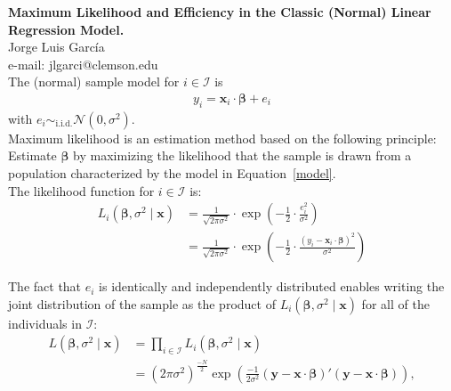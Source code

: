 
\let\counterwithout\relax
\let\counterwithin\relax
{}



\noindent \textbf{Maximum Likelihood and Efficiency in the Classic (Normal) Linear Regression Model.}\\
\noindent Jorge Luis García \\
\noindent e-mail: jlgarci@clemson.edu\\

\noindent The (normal) sample model for $i \in \mathcal{I}$ is
\begin{align}
	y_i = \bm{x}_i \cdot \bm{\beta} + e_i \label{model}
\end{align}
\noindent with $e_i \sim_{\text{i.i.d.}} \mathcal{N} \left( 0, \sigma^2 \right)$. \\ 

\noindent Maximum likelihood is an estimation method based on the following principle: Estimate $\bm{\beta}$ by maximizing the likelihood that the sample   is drawn from a population characterized by the model in Equation~\eqref{model}.\\

\noindent The likelihood function for $i \in \mathcal{I}$ is:
\begin{align}
	L_i \left( \bm{\beta}, \sigma^2 \mid \bm{x} \right) & = \frac{1}{\sqrt{2 \pi \sigma^2}} \cdot \exp{ \left( - \frac{1}{2} \cdot \frac{ e_i^2 }{ \sigma^2 } \right) } \nonumber \\ 
	& = \frac{1}{\sqrt{2 \pi \sigma^2}} \cdot \exp{ \left( - \frac{1}{2} \cdot \frac{ \left( y_i - \bm{x}_i \cdot \bm{\beta} \right)^2 }{ \sigma^2 } \right) } 
\end{align}

\noindent The fact that $e_i$ is identically and independently distributed enables writing the joint distribution of the sample as the product of $L_i \left( \bm{\beta}, \sigma^2 \mid \bm{x} \right)$ for all of the individuals in $\mathcal{I}$: 
\begin{align}
	L \left( \bm{\beta}, \sigma^2 \mid \bm{x} \right) & = \prod \limits _{i \in \mathcal{I}} L_i \left( \bm{\beta}, \sigma^2 \mid \bm{x} \right) \nonumber \\ 
	  & = {\left( 2 \pi \sigma^2 \right)}^{\frac{-N}{2}} \exp{ \left( \frac{-1}{2 \sigma^2} \left( \bm{y} - \bm{x} \cdot \bm{\beta} \right)' \left( \bm{y} - \bm{x} \cdot \bm{\beta} \right) \right) },  
\end{align}

